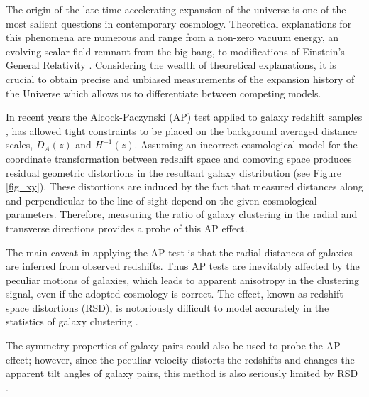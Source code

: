 \documentclass[iop]{emulateapj}
\begin{document}
The  origin  of  the late-time accelerating  expansion  of  the  universe  is  one of  the  most  salient  questions  in  contemporary cosmology. 
Theoretical explanations for this phenomena are numerous and range from a non-zero  vacuum energy, an evolving  scalar  field  remnant  from  the  big  bang, 
to modifications of Einstein's General Relativity \citep{Li2011,2012IJMPD..2130002Y}. 
Considering the wealth of theoretical explanations, 
it is crucial to obtain precise and unbiased measurements of the expansion history of the Universe which allows us to 
differentiate between competing models. 

In recent years the Alcock-Paczynski (AP) test \citep{AP1979} applied to galaxy redshift samples \citep{Outram2004,Blake2011,Alam2016}, 
has allowed tight constraints to be placed on the background averaged distance scales, $D_A(z)$ and $H^{-1}(z)$.  
Assuming an incorrect cosmological model for the coordinate transformation between redshift space and comoving space
produces residual geometric distortions in the resultant galaxy distribution (see Figure \ref{fig_xy}). 
These distortions are induced by the fact that measured distances along 
and perpendicular to the line of sight depend on the given cosmological parameters. 
Therefore, measuring the ratio of galaxy clustering in the radial and transverse directions provides a probe of this AP effect.


The main caveat in applying the AP test is that 
the radial distances of galaxies are inferred from observed redshifts.
Thus AP tests are inevitably affected by the peculiar motions of galaxies,
which leads to apparent anisotropy in the clustering signal, even if the adopted cosmology is correct.
The effect, known as redshift-space distortions (RSD),
is notoriously difficult to model accurately in the statistics of galaxy clustering \citep{Ballinger1996}.

The symmetry properties of galaxy pairs \citep{Marinoni2010}  could also be used to probe the AP effect;
however, since the peculiar velocity distorts the redshifts and changes the apparent tilt angles of galaxy pairs,
this method is also seriously limited by RSD \citep{Jennings2011}.
\end{document}
